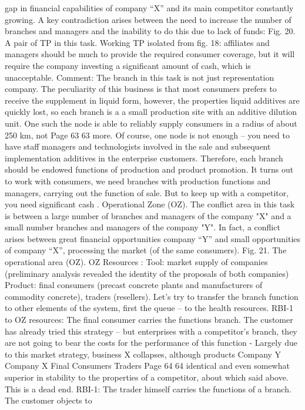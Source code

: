 gap in financial capabilities of company “X” and its main competitor
constantly growing.
A key contradiction arises between the need to increase the number of
branches and managers and the inability to do this due to lack of funds:
Fig. 20. A pair of TP in this task.
Working TP isolated from fig. 18: affiliates and managers should be
much to provide the required consumer coverage, but it will require the company
investing a significant amount of cash, which is unacceptable.
Comment: The branch in this task is not just representation
company. The peculiarity of this business is that most
consumers prefers to receive the supplement in liquid form, however, the properties
liquid additives are quickly lost, so each branch is a
a small production site with an additive dilution unit. One such
the node is able to reliably supply consumers in a radius of about 250 km, not
Page 63
63
more. Of course, one node is not enough -- you need to have staff
managers and technologists involved in the sale and subsequent implementation
additives in the enterprise customers. Therefore, each branch should be endowed
functions of production and product promotion. It turns out to work with
consumers, we need branches with production functions and managers,
carrying out the function of sale. But to keep up with a competitor, you need
significant cash .
Operational Zone (OZ). The conflict area in this task is between
a large number of branches and managers of the company "X" and a small number
branches and managers of the company "Y".
In fact, a conflict arises between great financial opportunities
company “Y” and small opportunities of company “X”, processing the market
(of the same consumers).
Fig. 21. The operational area (OZ).
OZ Resources :
Tool: market supply of companies (preliminary analysis
revealed the identity of the proposals of both companies)
Product: final consumers (precast concrete plants and manufacturers of commodity
concrete), traders (resellers).
Let's try to transfer the branch function to other elements of the system, first
the queue -- to the health resources.
RBI-1 to OZ resources: The final consumer carries the functions
branch.
The customer has already tried this strategy -- but enterprises with
a competitor’s branch, they are not going to bear the costs for the performance of this function -
Largely due to this market strategy, business X collapses, although products
Company Y
Company X
Final
Consumers
Traders
Page 64
64
identical and even somewhat superior in stability to the properties of a competitor, about which
said above. This is a dead end.
RBI-1: The trader himself carries the functions of a branch. The customer objects to
